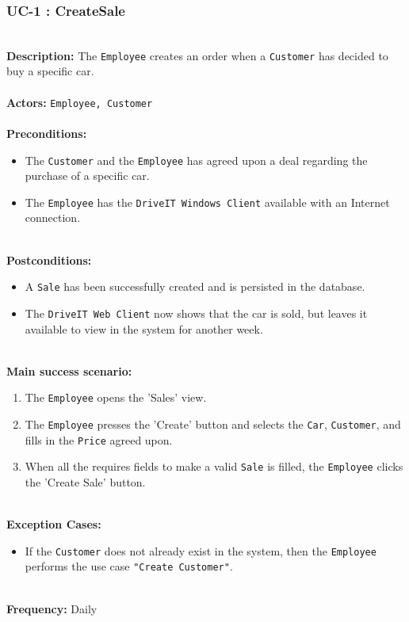 \subsubsection{UC-1 : CreateSale}
\label{create-order-use-case}
\HRule \\[0.4cm]
\textbf{Description:} The \texttt{Employee} creates an order when a \texttt{Customer} has decided to buy a specific car. \\
\HRule \\[0.4cm]
\textbf{Actors:} \texttt{Employee, Customer}\\
\HRule \\[0.4cm]
\textbf{Preconditions:} 
\begin{itemize}
    \item The \texttt{Customer} and the \texttt{Employee} has agreed upon a deal regarding the purchase of a specific car.
    \item The \texttt{Employee} has the \texttt{DriveIT Windows Client} available with an Internet connection.
\end{itemize}
\HRule \\[0.4cm]
\textbf{Postconditions:}
\begin{itemize}
    \item A \texttt{Sale} has been successfully created and is persisted in the database.
    \item The \texttt{DriveIT Web Client} now shows that the car is sold, but leaves it available to view in the system for another week.
\end{itemize}
\HRule \\[0.4cm]
\textbf{Main success scenario:}
\begin{enumerate}
    \item The \texttt{Employee} opens the 'Sales' view.
   
    \item The \texttt{Employee} presses the 'Create' button and selects the \texttt{Car}, \texttt{Customer}, and fills in the \texttt{Price} agreed upon.
    \item When all the requires fields to make a valid \texttt{Sale} is filled, the \texttt{Employee} clicks the 'Create Sale' button.
\end{enumerate}
\HRule \\[0.4cm]
\textbf{Exception Cases:}
\begin{itemize}
	\item If the \texttt{Customer} does not already exist in the system, then the \texttt{Employee} performs the use case \texttt{"Create Customer"}.
\end{itemize}
\HRule \\[0.4cm]
\textbf{Frequency:}
Daily \\
\HRule \\[0.4cm]


